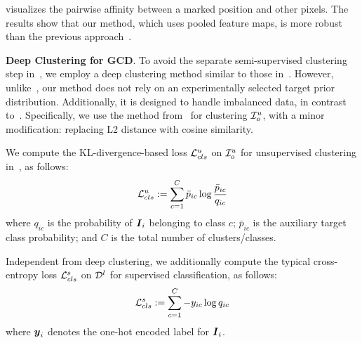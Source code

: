 



 visualizes the pairwise affinity between a marked position and other pixels. The results show that our method, which uses pooled feature maps, is more robust than the previous approach~\cite{zhang2020relation}.











\vspace{1mm}
\noindent \textbf{Deep Clustering for GCD}. 
To avoid the separate semi-supervised clustering step in~\cite{vaze2022generalized}, we employ a deep clustering method similar to those in~\cite{fomenko2022learning, wen2023parametric}. However, unlike~\cite{fomenko2022learning}, our method does not rely on an experimentally selected target prior distribution. Additionally, it is designed to handle imbalanced data, in contrast to~\cite{wen2023parametric}. Specifically, we use the method from~\cite{Zhang2021Supporting} for clustering $\mathcal{I}^u_o$, with a minor modification: replacing L2 distance with cosine similarity.

We compute the KL-divergence-based loss $\mathcal{L}^u_{cls}$ on $\mathcal{I}^u_o$ for unsupervised clustering in~\cite{Zhang2021Supporting}, as follows:
\begin{equation}
\begin{split}
\mathcal{L}^u_{cls} := \sum_{c=1}^C \bar{p}_{ic} \log \frac{\bar{p}_{ic}}{q_{ic}}
\label{eqn:loss_KL_divergence}
\end{split}
\end{equation}
where $q_{ic}$ is the probability of $\boldsymbol{I}_i$ belonging to class $c$; $\bar{p}_{ic}$ is the auxiliary target class probability; and $C$ is the total number of clusters/classes. %

Independent from deep clustering, we additionally compute the typical cross-entropy loss $\mathcal{L}^s_{cls}$ on $\mathcal{D}^l$ for supervised classification, as follows:
\begin{equation}
\begin{split}
\mathcal{L}^s_{cls} := \sum_{c=1}^C - y_{ic} \log q_{ic}
\label{eqn:loss_cross_entropy}
\end{split}
\end{equation}
where $\boldsymbol{y}_i$ denotes the one-hot encoded label for $\boldsymbol{I}_i$. 



